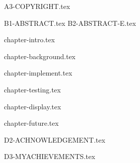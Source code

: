 \documentclass[12pt,openany,a4paper,fancyhdr,oneside]{ctexbook}
\begin{document}




 {A3-COPYRIGHT.tex}




\newpage
{}
\pagestyle{plain}
 {B1-ABSTRACT.tex}
 {B2-ABSTRACT-E.tex}

\setcounter{tocdepth}{2}
\tableofcontents



%

\newpage
{}
\pagestyle{fancy}



\setlength{\baselineskip}{25pt}  %

 {chapter-intro.tex}

 {chapter-background.tex}



 {chapter-implement.tex}

 {chapter-testing.tex}


 {chapter-display.tex}

 {chapter-future.tex}

\clearpage





\pagestyle{plain}
\clearpage
{}
{}
 {D2-ACHNOWLEDGEMENT.tex}
\pagestyle{plain}


\clearpage
{}
{}
 {D3-MYACHIEVEMENTS.tex}


\printindex
\end{document}
